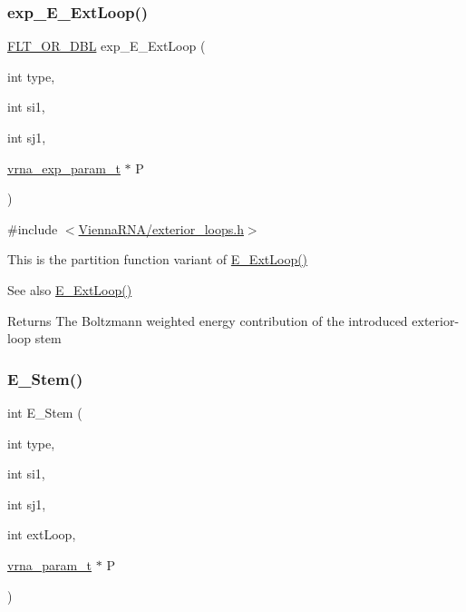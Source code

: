 \subsubsection{\texorpdfstring{exp\+\_\+\+E\+\_\+\+Ext\+Loop()}{exp\_E\_ExtLoop()}}
{\footnotesize\ttfamily \hyperlink{group__data__structures_ga31125aeace516926bf7f251f759b6126}{F\+L\+T\+\_\+\+O\+R\+\_\+\+D\+BL} exp\+\_\+\+E\+\_\+\+Ext\+Loop (\begin{DoxyParamCaption}\item[{int}]{type,  }\item[{int}]{si1,  }\item[{int}]{sj1,  }\item[{\hyperlink{group__energy__parameters_ga01d8b92fe734df8d79a6169482c7d8d8}{vrna\+\_\+exp\+\_\+param\+\_\+t} $\ast$}]{P }\end{DoxyParamCaption})}



{\ttfamily \#include $<$\hyperlink{exterior__loops_8h}{Vienna\+R\+N\+A/exterior\+\_\+loops.\+h}$>$}

This is the partition function variant of \hyperlink{group__loops_ga05c6288c5a79d3bd5ad6d33c1bb34bd0}{E\+\_\+\+Ext\+Loop()} \begin{DoxySeeAlso}{See also}
\hyperlink{group__loops_ga05c6288c5a79d3bd5ad6d33c1bb34bd0}{E\+\_\+\+Ext\+Loop()} 
\end{DoxySeeAlso}
\begin{DoxyReturn}{Returns}
The Boltzmann weighted energy contribution of the introduced exterior-\/loop stem 
\end{DoxyReturn}
\mbox{\label{group__loops_ga51f9851f3500c2aae66674142a6a2dd5}} 
\subsubsection{\texorpdfstring{E\+\_\+\+Stem()}{E\_Stem()}}
{\footnotesize\ttfamily int E\+\_\+\+Stem (\begin{DoxyParamCaption}\item[{int}]{type,  }\item[{int}]{si1,  }\item[{int}]{sj1,  }\item[{int}]{ext\+Loop,  }\item[{\hyperlink{group__energy__parameters_ga8a69ca7d787e4fd6079914f5343a1f35}{vrna\+\_\+param\+\_\+t} $\ast$}]{P }\end{DoxyParamCaption})}



